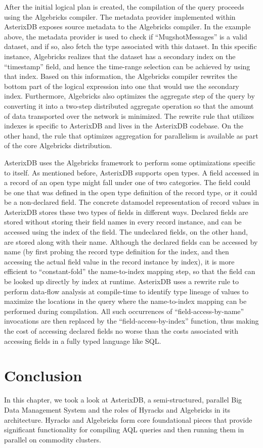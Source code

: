 After the initial logical plan is created, the compilation of the query proceeds using the Algebricks compiler. The metadata provider implemented within AsterixDB exposes source metadata to the Algebricks compiler. In the example above, the metadata provider is used to check if ``MugshotMessages'' is a valid dataset, and if so, also fetch the type associated with this dataset. In this specific instance, Algebricks realizes that the dataset has a secondary index on the ``timestamp'' field, and hence the time-range selection can be achieved by using that index. Based on this information, the Algebricks compiler rewrites the bottom part of the logical expression into one that would use the secondary index. Furthermore, Algebricks also optimizes the aggregate step of the query by converting it into a two-step distributed aggregate operation so that the amount of data transported over the network is minimized. The rewrite rule that utilizes indexes is specific to AsterixDB and lives in the AsterixDB codebase. On the other hand, the rule that optimizes aggregation for parallelism is available as part of the core Algebricks distribution.

AsterixDB uses the Algebricks framework to perform some optimizations specific to itself. As mentioned before, AsterixDB supports open types. A field accessed in a record of an open type might fall under one of two categories. The field could be one that was defined in the open type definition of the record type, or it could be a non-declared field. The concrete datamodel representation of record values in AsterixDB stores these two types of fields in different ways. Declared fields are stored without storing their field names in every record instance, and can be accessed using the index of the field. The undeclared fields, on the other hand, are stored along with their name. Although the declared fields can be accessed by name (by first probing the record type definition for the index, and then accessing the actual field value in the record instance by index), it is more efficient to ``constant-fold'' the name-to-index mapping step, so that the field can be looked up directly by index at runtime. AsterixDB uses a rewrite rule to perform data-flow analysis at compile-time to identify type lineage of values to maximize the locations in the query where the name-to-index mapping can be performed during compilation. All such occurrences of ``field-access-by-name'' invocations are then replaced by the ``field-access-by-index'' function, thus making the cost of accessing declared fields no worse than the costs associated with accessing fields in a fully typed language like SQL.

\section{Conclusion}

In this chapter, we took a look at AsterixDB, a semi-structured, parallel Big Data Management System and the roles of Hyracks and Algebricks in its architecture. Hyracks and Algebricks form core foundational pieces that provide significant functionality for compiling AQL queries and then running them in parallel on commodity clusters.
